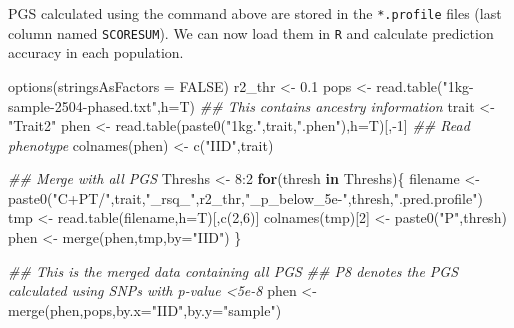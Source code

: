 \documentclass[
  letterpaper,
  DIV=11,
  numbers=noendperiod]{scrartcl}
\newenvironment{Shaded}{\begin{snugshade}}{\end{snugshade}}
\newcommand{\AttributeTok}[1]{\textcolor[rgb]{0.40,0.45,0.13}{#1}}
\newcommand{\ConstantTok}[1]{\textcolor[rgb]{0.56,0.35,0.01}{#1}}
\newcommand{\ControlFlowTok}[1]{\textcolor[rgb]{0.00,0.23,0.31}{\textbf{#1}}}
\newcommand{\DecValTok}[1]{\textcolor[rgb]{0.68,0.00,0.00}{#1}}
\newcommand{\DocumentationTok}[1]{\textcolor[rgb]{0.37,0.37,0.37}{\textit{#1}}}
\newcommand{\FloatTok}[1]{\textcolor[rgb]{0.68,0.00,0.00}{#1}}
\newcommand{\FunctionTok}[1]{\textcolor[rgb]{0.28,0.35,0.67}{#1}}
\newcommand{\NormalTok}[1]{\textcolor[rgb]{0.00,0.23,0.31}{#1}}
\newcommand{\OtherTok}[1]{\textcolor[rgb]{0.00,0.23,0.31}{#1}}
\newcommand{\SpecialCharTok}[1]{\textcolor[rgb]{0.37,0.37,0.37}{#1}}
\newcommand{\StringTok}[1]{\textcolor[rgb]{0.13,0.47,0.30}{#1}}
\begin{document}
PGS calculated using the command above are stored in the
\texttt{*.profile} files (last column named \texttt{SCORESUM}). We can
now load them in \texttt{R} and calculate prediction accuracy in each
population.

\begin{Shaded}
\begin{Highlighting}[]
\FunctionTok{options}\NormalTok{(}\AttributeTok{stringsAsFactors =} \ConstantTok{FALSE}\NormalTok{)}
\NormalTok{r2\_thr }\OtherTok{\textless{}{-}} \FloatTok{0.1}
\NormalTok{pops   }\OtherTok{\textless{}{-}} \FunctionTok{read.table}\NormalTok{(}\StringTok{"1kg{-}sample{-}2504{-}phased.txt"}\NormalTok{,}\AttributeTok{h=}\NormalTok{T) }\DocumentationTok{\#\# This contains ancestry information}
\NormalTok{trait  }\OtherTok{\textless{}{-}} \StringTok{"Trait2"}
\NormalTok{phen   }\OtherTok{\textless{}{-}} \FunctionTok{read.table}\NormalTok{(}\FunctionTok{paste0}\NormalTok{(}\StringTok{"1kg."}\NormalTok{,trait,}\StringTok{".phen"}\NormalTok{),}\AttributeTok{h=}\NormalTok{T)[,}\SpecialCharTok{{-}}\DecValTok{1}\NormalTok{] }\DocumentationTok{\#\# Read phenotype}
\FunctionTok{colnames}\NormalTok{(phen) }\OtherTok{\textless{}{-}} \FunctionTok{c}\NormalTok{(}\StringTok{"IID"}\NormalTok{,trait)}

\DocumentationTok{\#\# Merge with all PGS}
\NormalTok{Threshs }\OtherTok{\textless{}{-}} \DecValTok{8}\SpecialCharTok{:}\DecValTok{2}
\ControlFlowTok{for}\NormalTok{(thresh }\ControlFlowTok{in}\NormalTok{ Threshs)\{}
\NormalTok{  filename }\OtherTok{\textless{}{-}} \FunctionTok{paste0}\NormalTok{(}\StringTok{"C+PT/"}\NormalTok{,trait,}\StringTok{"\_rsq\_"}\NormalTok{,r2\_thr,}\StringTok{"\_p\_below\_5e{-}"}\NormalTok{,thresh,}\StringTok{".pred.profile"}\NormalTok{)}
\NormalTok{  tmp }\OtherTok{\textless{}{-}} \FunctionTok{read.table}\NormalTok{(filename,}\AttributeTok{h=}\NormalTok{T)[,}\FunctionTok{c}\NormalTok{(}\DecValTok{2}\NormalTok{,}\DecValTok{6}\NormalTok{)]}
  \FunctionTok{colnames}\NormalTok{(tmp)[}\DecValTok{2}\NormalTok{] }\OtherTok{\textless{}{-}} \FunctionTok{paste0}\NormalTok{(}\StringTok{"P"}\NormalTok{,thresh)}
\NormalTok{  phen }\OtherTok{\textless{}{-}} \FunctionTok{merge}\NormalTok{(phen,tmp,}\AttributeTok{by=}\StringTok{"IID"}\NormalTok{)}
\NormalTok{\}}

\DocumentationTok{\#\# This is the merged data containing all PGS}
\DocumentationTok{\#\# P8 denotes the PGS calculated using SNPs with p{-}value \textless{}5e{-}8}
\NormalTok{phen }\OtherTok{\textless{}{-}} \FunctionTok{merge}\NormalTok{(phen,pops,}\AttributeTok{by.x=}\StringTok{"IID"}\NormalTok{,}\AttributeTok{by.y=}\StringTok{"sample"}\NormalTok{)}


\end{Highlighting}
\end{Shaded}
\end{document}
